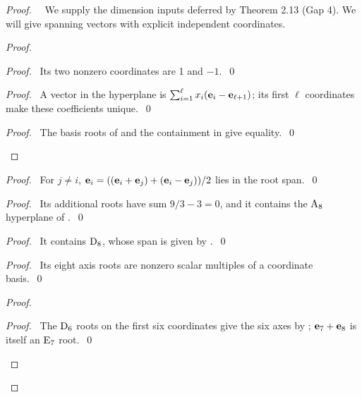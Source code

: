 \begin{proof}
 \pfsketch\ \repair\ We supply the dimension inputs deferred by Theorem 2.13
 (Gap 4). We will give spanning vectors with explicit independent coordinates.
 \begin{proof}
  \begin{proof}\pf\ Its two nonzero coordinates are 1 and $-1$.~\qed\end{proof}
  \begin{proof}\pf\ A vector in the hyperplane is
   $\sum_{i=1}^\ell x_i({\mathbf e}_i-{\mathbf e}_{\ell+1})$; its first $\ell$ coordinates make
   these coefficients unique.~\qed\end{proof}
  \qedstep
  \begin{proof}\pf\ The basis roots of  and the containment
   in  give equality.~\qed\end{proof}
 \end{proof}
 \begin{proof}\pf\ For $j\ne i$,
  ${\mathbf e}_i=(({\mathbf e}_i+{\mathbf e}_j)+({\mathbf e}_i-{\mathbf e}_j))/2$ lies in the root span.~\qed\end{proof}
 \begin{proof}\pf\ Its additional roots have sum $9/3-3=0$, and it contains the
  $\mathrm{A}_8$ hyperplane of .~\qed\end{proof}
 \begin{proof}\pf\ It contains $\mathrm{D}_8$, whose span is given by .~\qed\end{proof}
 \begin{proof}\pf\ Its eight axis roots are nonzero scalar multiples of a coordinate basis.~\qed\end{proof}
 \begin{proof}
  \begin{proof}\pf\ The $\mathrm{D}_6$ roots on the first six coordinates give the six axes
   by ; ${\mathbf e}_7+{\mathbf e}_8$ is itself an $\mathrm{E}_7$ root.~\qed\end{proof}

\end{proof}
\end{proof}
